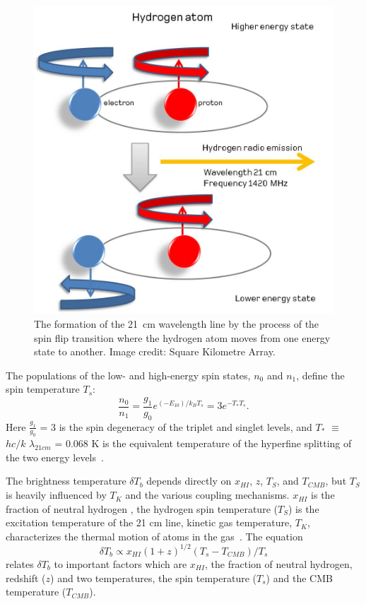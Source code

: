 \begin{figure}
	\begin{center}
		\includegraphics[width=0.5\linewidth]{Figures/Hydrogenemission1.jpeg}
		\caption{The formation of the \SI{21}{cm} wavelength line by the process of the spin flip transition where the hydrogen atom moves from one energy state to another. Image credit: {Square Kilometre Array}.}
		\label{Fig:21cm}
	\end{center}
\end{figure}

The populations of the low- and high-energy spin states, $n_0$ and $n_1$, define the spin temperature $T_s$:
\begin{equation}
\frac{n_0}{n_1} = \frac{g_1}{g_0}e^{(-E_10)/{k_B}{T_s}} = 3e^{{-T_*}{T_s}}.
\end{equation}
Here $\frac{g_1}{g_0}$ = 3 is the spin degeneracy of the triplet and singlet levels, and $T_{*}$ $\equiv$ $hc/k$ $\lambda_{21cm}$ = 0.068 K is the equivalent temperature of the hyperfine splitting of the two energy levels~\citep{2012RPPh...75h6901P}.

The  brightness temperature $\delta$$T_b$ depends directly on $x_{HI}$, $z$, $T_S$, and $T_{CMB}$, but $T_S$ is heavily influenced by $T_K$ and the various coupling mechanisms. $x_{HI}$ is the fraction of neutral hydrogen , the hydrogen spin temperature ($T_S$) is the excitation temperature of the 21 cm line, kinetic gas temperature, $T_K$, characterizes the thermal motion of atoms in the gas~\citep{2015aska.confE...1K,2006PhR...433..181F}. The equation	
\begin{equation}
\delta{T_b}\propto {x_{HI}}(1+z)^{1/2}({T_s}-{T_{CMB}})/{T_s}
\end{equation}
relates $\delta$$T_b$ to important factors which are \(x_{HI}\), the fraction of neutral hydrogen, redshift ($z$) and two temperatures, the spin temperature ($T_s$) and the CMB temperature ($T_{CMB}$).

